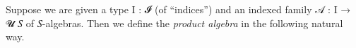 \documentclass[a4paper,UKenglish,cleveref,autoref,thm-restate,11pt]{lipics-v2021}
\begin{document}
Suppose we are given a type \ab I \as : \ab 𝓘 (of ``indices'') and an indexed family \ab 𝒜 \as : \ab I \as →  \ab 𝓤 \ab 𝑆 of \ab 𝑆-algebras. Then we define the \emph{product algebra}
  in the following natural way.
\ccpad
\begin{code}%
\>[0]\AgdaSpace{}%
\AgdaSymbol{:}\AgdaSpace{}%
\AgdaSymbol{\{}\AgdaSpace{}%
\AgdaSymbol{:}\AgdaSpace{}%
\AgdaSpace{}%
\AgdaSpace{}%
\AgdaSymbol{\}(}\AgdaSpace{}%
\AgdaSymbol{:}\AgdaSpace{}%
\AgdaSpace{}%
\AgdaSpace{}%
\AgdaSpace{}%
\AgdaSpace{}%
\AgdaSpace{}%
\AgdaSymbol{)}\AgdaSpace{}%
\AgdaSpace{}%
\AgdaSpace{}%
\AgdaSymbol{(}\AgdaSpace{}%
\AgdaSpace{}%
\AgdaSymbol{)}\AgdaSpace{}%
\<%
\\
%
\\[\AgdaEmptyExtraSkip]%
\>[0]\AgdaSpace{}%
\AgdaSpace{}%
\AgdaSymbol{=}%
\>[48I]\AgdaSpace{}%
\AgdaSpace{}%
\AgdaSpace{}%
\AgdaSpace{}%
\AgdaSpace{}%
\AgdaSpace{}%
\AgdaSymbol{)}\AgdaSpace{}%
\AgdaOperator{\AgdaInductiveConstructor{,}}%
\>[39]\<%
\\
%
\>[.][@{}l@{}]\<[48I]%
\>[7]\AgdaSpace{}%
\AgdaSpace{}%
\AgdaSpace{}%
\AgdaSpace{}%
\AgdaSpace{}%
\AgdaSymbol{(}\AgdaSpace{}%
\AgdaSpace{}%
\AgdaSpace{}%
\AgdaSymbol{)}\AgdaSpace{}%
\AgdaSpace{}%
\AgdaSpace{}%
\AgdaSpace{}%
\AgdaSpace{}%
\AgdaSpace{}%
%
\>[39]\<%
\end{code}
\scpad
\end{document}
